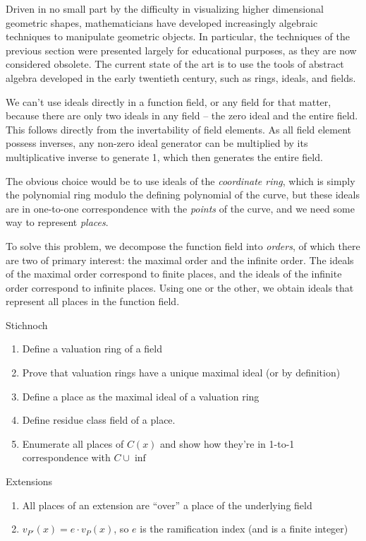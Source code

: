 \vfill\eject
{}

Driven in no small part by the difficulty in visualizing higher dimensional geometric shapes,
mathematicians have developed increasingly algebraic techniques to manipulate geometric objects.
In particular, the techniques of the previous section were presented largely for educational purposes,
as they are now considered obsolete.
The current state of the art is to use the tools of abstract algebra developed in the early
twentieth century, such as rings, ideals, and fields.

We can't use ideals directly in a function field, or any field for that matter, because
there are only two ideals in any field -- the zero ideal and the entire field.  This
follows directly from the invertability of field elements.  As all field element possess
inverses, any non-zero ideal generator can be multiplied by its multiplicative inverse
to generate 1, which then generates the entire field.

The obvious choice would be to use ideals of the {\it coordinate ring}, which is simply
the polynomial ring modulo the defining polynomial of the curve, but these ideals
are in one-to-one correspondence with the {\it points} of the curve, and we need
some way to represent {\it places}.

To solve this problem, we decompose the function field into {\it orders}, of which
there are two of primary interest: the maximal order and the infinite order.
The ideals of the maximal order correspond to
finite places, and the ideals of the infinite order correspond to infinite places.
Using one or the other, we obtain ideals that represent all places in the function field.

Stichnoch

\begin{enumerate}
\item Define a valuation ring of a field
\item Prove that valuation rings have a unique maximal ideal (or by definition)
\item Define a place as the maximal ideal of a valuation ring
\item Define residue class field of a place.
\item Enumerate all places of $C(x)$ and show how they're in 1-to-1 correspondence with $C \cup \inf$
\end{enumerate}

Extensions

\begin{enumerate}
\item All places of an extension are ``over'' a place of the underlying field
\item $v_{P'}(x) = e\cdot v_P(x)$, so $e$ is the ramification index (and is a finite integer)
\end{enumerate}

